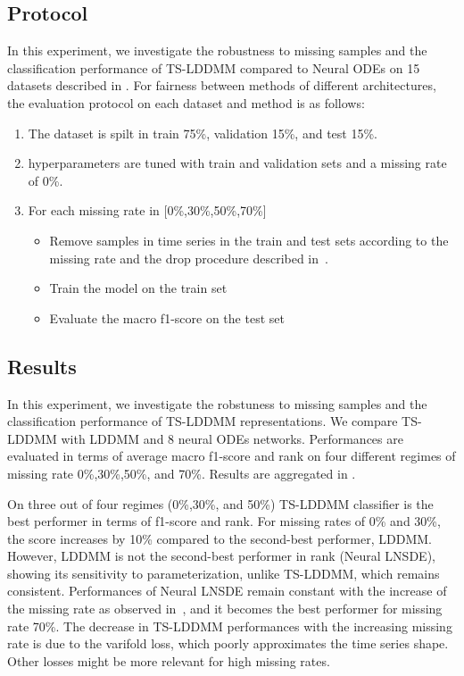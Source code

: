 \subsection{Protocol}
In this experiment, we investigate the robustness to missing samples and the classification performance of TS-LDDMM compared to Neural ODEs on 15 datasets described in . For fairness between methods of different architectures, the evaluation protocol on each dataset and method is as follows: 
\begin{enumerate}
  \item The dataset is spilt in train 75\%, validation 15\%, and test 15\%.
  \item hyperparameters are tuned with train and validation sets and a missing rate of 0\%.
  \item For each missing rate in [0\%,30\%,50\%,70\%]
    \begin{itemize}
      \item Remove samples in time series in the train and test sets according to the missing rate and the drop procedure described in~\cite{kidger2020neural}.
      \item Train the model on the train set
      \item Evaluate the macro f1-score on the test set
    \end{itemize}
\end{enumerate}




\subsection{Results}
In this experiment, we investigate the robstuness to missing samples and the classification performance of TS-LDDMM representations. We compare TS-LDDMM with LDDMM and 8 neural ODEs networks. Performances are evaluated in terms of average macro f1-score and rank on four different regimes of missing rate 0\%,30\%,50\%, and 70\%. Results are aggregated in . 

On three out of four regimes (0\%,30\%, and 50\%) TS-LDDMM classifier is the best performer in terms of f1-score and rank. For missing rates of 0\% and 30\%, the score increases by 10\% compared to the second-best performer, LDDMM. However, LDDMM is not the second-best performer in rank (Neural LNSDE), showing its sensitivity to parameterization, unlike TS-LDDMM, which remains consistent. Performances of Neural LNSDE remain constant with the increase of the missing rate as observed in~\cite{oh2024stable}, and it becomes the best performer for missing rate 70\%. The decrease in TS-LDDMM performances with the increasing missing rate is due to the varifold loss, which poorly approximates the time series shape. Other losses might be more relevant for high missing rates.

